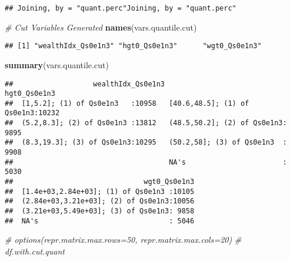 \documentclass[
]{book}
\newenvironment{Shaded}{\begin{snugshade}}{\end{snugshade}}
\newcommand{\CommentTok}[1]{\textcolor[rgb]{0.56,0.35,0.01}{\textit{#1}}}
\newcommand{\KeywordTok}[1]{\textcolor[rgb]{0.13,0.29,0.53}{\textbf{#1}}}
\newcommand{\NormalTok}[1]{#1}
\newcommand{\OperatorTok}[1]{\textcolor[rgb]{0.81,0.36,0.00}{\textbf{#1}}}
\newcommand{\StringTok}[1]{\textcolor[rgb]{0.31,0.60,0.02}{#1}}
\begin{document}
\begin{verbatim}
## Joining, by = "quant.perc"Joining, by = "quant.perc"
\end{verbatim}

\begin{Shaded}
\end{Shaded}

\begin{Shaded}
\begin{Highlighting}[]
\CommentTok{# Cut Variables Generated}
\KeywordTok{names}\NormalTok{(vars.quantile.cut)}
\end{Highlighting}
\end{Shaded}

\begin{verbatim}
## [1] "wealthIdx_Qs0e1n3" "hgt0_Qs0e1n3"      "wgt0_Qs0e1n3"
\end{verbatim}

\begin{Shaded}
\begin{Highlighting}[]
\KeywordTok{summary}\NormalTok{(vars.quantile.cut)}
\end{Highlighting}
\end{Shaded}

\begin{verbatim}
##                   wealthIdx_Qs0e1n3                      hgt0_Qs0e1n3  
##  [1,5.2]; (1) of Qs0e1n3   :10958   [40.6,48.5]; (1) of Qs0e1n3:10232  
##  (5.2,8.3]; (2) of Qs0e1n3 :13812   (48.5,50.2]; (2) of Qs0e1n3: 9895  
##  (8.3,19.3]; (3) of Qs0e1n3:10295   (50.2,58]; (3) of Qs0e1n3  : 9908  
##                                     NA's                       : 5030  
##                               wgt0_Qs0e1n3  
##  [1.4e+03,2.84e+03]; (1) of Qs0e1n3 :10105  
##  (2.84e+03,3.21e+03]; (2) of Qs0e1n3:10056  
##  (3.21e+03,5.49e+03]; (3) of Qs0e1n3: 9858  
##  NA's                               : 5046
\end{verbatim}

\begin{Shaded}
\begin{Highlighting}[]
\CommentTok{# options(repr.matrix.max.rows=50, repr.matrix.max.cols=20)}
\CommentTok{# df.with.cut.quant}
\end{Highlighting}
\end{Shaded}
\end{document}
